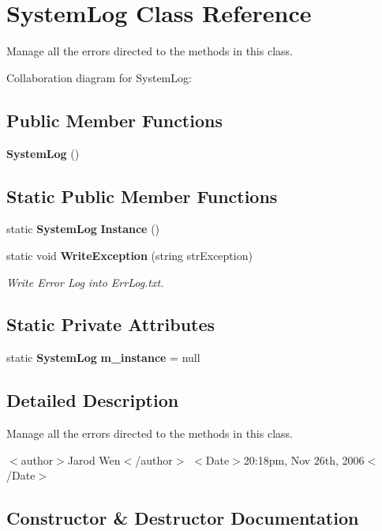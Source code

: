 \section{System\-Log Class Reference}
\label{class_system_log}
Manage all the errors directed to the methods in this class.  


Collaboration diagram for System\-Log:\subsection*{Public Member Functions}
\begin{CompactItemize}
\item 
{\bf System\-Log} ()
\end{CompactItemize}
\subsection*{Static Public Member Functions}
\begin{CompactItemize}
\item 
static {\bf System\-Log} {\bf Instance} ()
\item 
static void {\bf Write\-Exception} (string str\-Exception)
\begin{CompactList}\small\item\em Write Error Log into Err\-Log.txt. \item\end{CompactList}\end{CompactItemize}
\subsection*{Static Private Attributes}
\begin{CompactItemize}
\item 
static {\bf System\-Log} {\bf m\_\-instance} = null
\end{CompactItemize}


\subsection{Detailed Description}
Manage all the errors directed to the methods in this class. 

$<$author$>$Jarod Wen$<$/author$>$ $<$Date$>$20:18pm, Nov 26th, 2006$<$/Date$>$ 



\subsection{Constructor \& Destructor Documentation}
